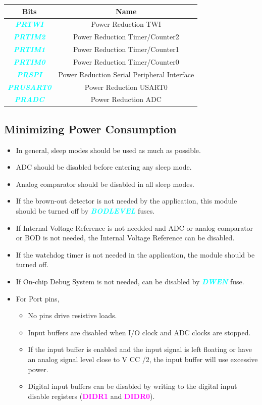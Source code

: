 \documentclass{article}
\newcommand{\bitFormat}[1]{\emph{\textbf{\textcolor{cyan}{#1}}}}
\newcommand{\regFormat}[1]{\textbf{\textcolor{magenta}{#1}}}
\begin{document}
\begin{table}[H]
    \begin{center}
        \begin{tabular}{c|c}
            \textbf{Bits} & \textbf{Name}\\
            \hline
            \bitFormat{PRTWI} & Power Reduction TWI\\
            \bitFormat{PRTIM2} & Power Reduction Timer/Counter2\\
            \bitFormat{PRTIM1} & Power Reduction Timer/Counter1\\
            \bitFormat{PRTIM0} & Power Reduction Timer/Counter0\\
            \bitFormat{PRSPI} & Power Reduction Serial Peripheral Interface\\
            \bitFormat{PRUSART0} & Power Reduction USART0\\
            \bitFormat{PRADC} & Power Reduction ADC\\
        \end{tabular}
    \end{center}
\end{table}

\subsection{Minimizing Power Consumption}
\begin{itemize}
    \item In general, sleep modes should be used as much as possible.
    \item ADC should be disabled before entering any sleep mode.
    \item Analog comparator should be disabled in  all sleep modes.
    \item If the brown-out detector is not needed by the application, this module should be turned off by \bitFormat{BODLEVEL} fuses.
    \item If Internal Voltage Reference is not needded and ADC or analog comparator or BOD is not needed, the Internal Voltage Reference can be disabled.
    \item If the watchdog timer is not needed in the application, the module should be turned off.
    \item If On-chip Debug System is not needed, can be disabled by \bitFormat{DWEN} fuse.
    \item For Port pins,
    \begin{itemize}
        \item No pins drive resistive loads.
        \item Input buffers are disabled when I/O clock and ADC clocks are stopped.
        \item If the input buffer is enabled and the input signal is left floating or have an analog signal level close to V CC /2, the input buffer will use excessive power.
        \item Digital input buffers can be disabled by writing to the digital input disable registers (\regFormat{DIDR1} and \regFormat{DIDR0}).
    \end{itemize}
\end{itemize}
\end{document}
